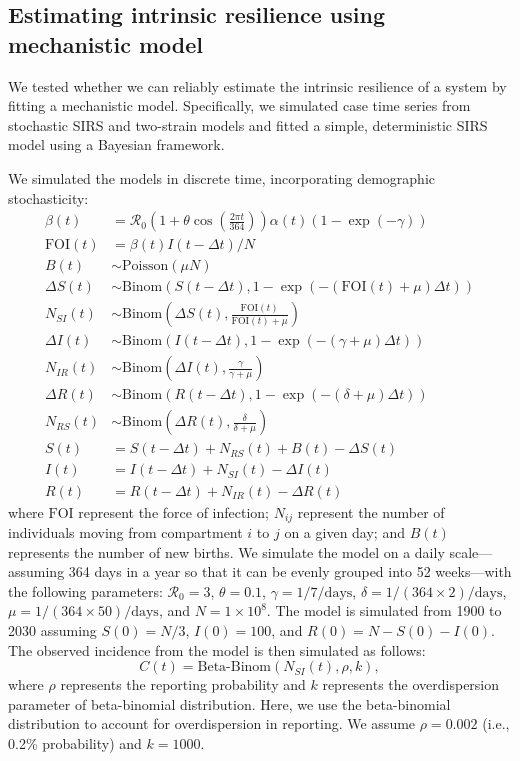 \documentclass[12pt]{article}
\begin{document}
\subsection*{Estimating intrinsic resilience using mechanistic model}

We tested whether we can reliably estimate the intrinsic resilience of a system by fitting a mechanistic model.
Specifically, we simulated case time series from stochastic SIRS and two-strain models and fitted a simple, deterministic SIRS model using a Bayesian framework.

We simulated the models in discrete time, incorporating demographic stochasticity:
\begin{align}
\beta(t) &= \mathcal R_0 \left(1 + \theta \cos\left(\frac{2 \pi t}{364}\right)\right) \alpha(t)  (1-\exp(-\gamma))\\
\textrm{FOI}(t) &= \beta(t) I(t- \Delta t)/N\\
B(t) &\sim \mathrm{Poisson}(\mu N)\\
\Delta S(t) &\sim \mathrm{Binom}\left(S(t-\Delta t), 1- \exp(-(\textrm{FOI}(t) + \mu) \Delta t )\right) \\
N_{SI}(t) &\sim \mathrm{Binom}\left(\Delta S(t), \frac{\textrm{FOI}(t)}{\textrm{FOI}(t) + \mu} \right)\\
\Delta I(t) &\sim \mathrm{Binom}\left(I(t-\Delta t), 1- \exp(-(\gamma + \mu) \Delta t )\right) \\
N_{IR}(t) &\sim \mathrm{Binom}\left(\Delta I(t), \frac{\gamma}{\gamma + \mu} \right)\\
\Delta R(t) &\sim \mathrm{Binom}\left(R(t-\Delta t), 1- \exp(-(\delta+ \mu) \Delta t )\right) \\
N_{RS}(t) &\sim \mathrm{Binom}\left(\Delta R(t), \frac{\delta}{\delta + \mu} \right)\\
S(t) &= S(t-\Delta t) + N_{RS}(t) + B(t) - \Delta S(t)\\
I(t) &= I(t-\Delta t) + N_{SI}(t) - \Delta I(t)\\
R(t) &= R(t-\Delta t) + N_{IR}(t) - \Delta R(t)
\end{align}
where $\textrm{FOI}$ represent the force of infection;
$N_{ij}$ represent the number of individuals moving from compartment $i$ to $j$ on a given day; 
and $B(t)$ represents the number of new births.
We simulate the model on a daily scale---assuming 364 days in a year so that it can be evenly grouped into 52 weeks---with the following parameters:
$\mathcal R_0 = 3$, $\theta = 0.1$, $\gamma = 1/7/\mathrm{days}$, $\delta = 1/(364\times 2)/\mathrm{days}$,
$\mu =1/(364\times 50)/\mathrm{days}$, and $N = 1 \times 10^{8}$.
The model is simulated from 1900 to 2030 assuming $S(0) = N/3$, $I(0) = 100$, and $R(0) = N - S(0) - I(0)$.
The observed incidence from the model is then simulated as follows:
\begin{equation}
C(t) = \textrm{Beta-Binom}(N_{SI}(t), \rho, k), 
\end{equation}
where $\rho$ represents the reporting probability and $k$ represents the overdispersion parameter of beta-binomial distribution.
Here, we use the beta-binomial distribution to account for overdispersion in reporting.
We assume $\rho = 0.002$ (i.e., 0.2\% probability) and $k = 1000$.
\end{document}
